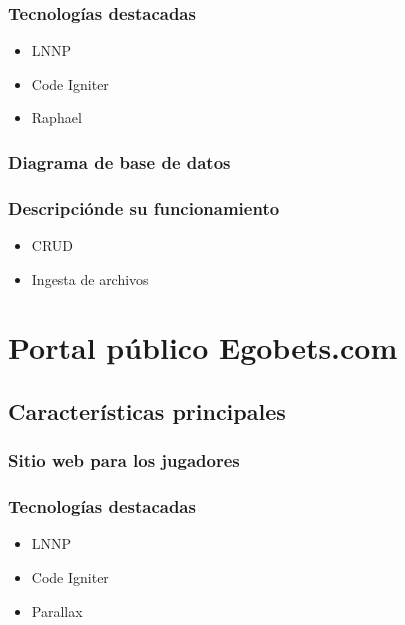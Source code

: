  \cite{alfredo2005ingenieria}
 
 \subsubsection{Tecnologías destacadas}
 
 \begin{itemize}
 	\item LNNP
 	\item Code Igniter
 	\item Raphael
 \end{itemize}
 
 \subsubsection{Diagrama de base de datos}
 
 \subsubsection{Descripciónde su funcionamiento}
 
 \begin{itemize}
 	\item CRUD
 	\item Ingesta de archivos
	
 \end{itemize}
 

\section{Portal público Egobets.com}

\subsection{Características principales}
\subsubsection{Sitio web para los jugadores}
\subsubsection{Tecnologías destacadas}
 
 \begin{itemize}
 	\item LNNP
 	\item Code Igniter
 	\item Parallax
 \end{itemize}
  
